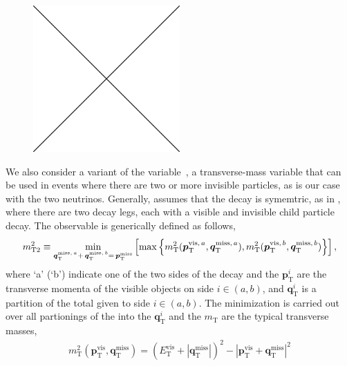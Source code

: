 \begin{figure}[!htb]
    \begin{center}
        \includegraphics[width=0.5\textwidth]{figures/placeholder}
        \caption{
            \htratio
        }
        \label{fig:hh_shape_htratio}
    \end{center}
\end{figure}

We also consider a variant of the \mttwo variable~\cite{MT2-Glamour,Lester2011,MT2-Tovey-Masses,Lester2014yga},
a transverse-mass variable that can be used in events where there are two or more invisible particles,
as is our case with the two neutrinos.
Generally, \mttwo assumes that the decay is symemtric, as in \ttbar, where there are two decay legs, each with
a visible and invisible child particle decay.
The \mttwo observable is generically defined as follows,
\begin{align}
    m_{\text{T2}}^2 \equiv \min\limits_{ \bm{q}_{\text{T}}^{\text{miss},\,a} + \, \bm{q}_{\text{T}}^{\text{miss},\,b} = \,\bm{p}_{\text{T}}^{\text{miss}}}
        \left[
            \max
                \left\{
                    m_{\text{T}}^2 ( \bm{p}_{\text{T}}^{\text{vis},\, a}, \bm{q}_{\text{T}}^{\text{miss},\,a} ), m_{\text{T}}^2 (\bm{p}_{\text{T}}^{\text{vis},\, b}, \bm{q}_{\text{T}}^{\text{miss},\,b} )
                \right\}
        \right],
    \label{eq:mttwo_def}
\end{align}
where `a' (`b') indicate one of the two sides of the decay and the $\bm{p}_{\text{T}}^i$ are the transverse momenta
of the visible objects on side $i \in (a,b)$, and $\bm{q}_{\text{T}}^i$ is a partition of the total \ptmiss given to side $i \in (a,b)$.
The minimization is carried out over all partionings of the \ptmiss into the $\bm{q}_{\text{T}}^i$ and the $m_{\text{T}}$ are the typical
transverse masses,
\begin{align}
    m_{\text{T}}^2 (\bm{p}_{\text{T}}^{\text{vis}}, \bm{q}_{\text{T}}^{\text{miss}} ) = ( E_{\text{T}}^{\text{vis}} + | \bm{q}_{\text{T}}^{\text{miss}} |)^2
            - |\bm{p}_{\text{T}}^{\text{vis}} + \bm{q}_{\text{T}}^{\text{miss}} |^2
    \label{eq:mt_def}
\end{align}

